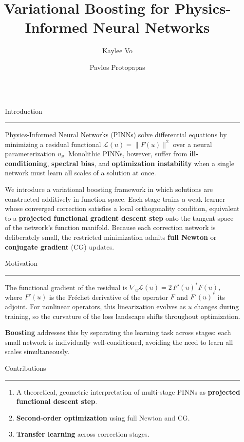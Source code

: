 \documentclass[final]{beamer}
\title{Variational Boosting for Physics-Informed Neural
Networks}
\author{Kaylee Vo \and Pavlos Protopapas}
\institute[shortinst]{Harvard John A. Paulson School of Engineering and Applied Sciences}
\newlength{\sepwidth}
\newlength{\colwidth}
\newcommand{\separatorcolumn}{\begin{column}{\sepwidth}\end{column}}
\newcommand{\blockrule}{\vspace{-1.5em}\textcolor{harvardcrimson}{\rule{\linewidth}{1.2pt}}\vspace{-0.2em}}
\begin{document}
\begin{frame}[t]
\begin{columns}[t]
\separatorcolumn

\begin{column}{\colwidth}

  \begin{block}{Introduction}
    \blockrule
    
    Physics-Informed Neural Networks (PINNs) solve differential equations by minimizing a residual functional $\mathcal{L}(u) = \|F(u)\|^2$ over a neural parameterization $u_\theta$. Monolithic PINNs, however, suffer from \textbf{ill-conditioning}, \textbf{spectral bias}, and \textbf{optimization instability} when a single network must learn all scales of a solution at once.

    We introduce a variational boosting framework \cite{fang-2023} in which solutions are constructed additively in function space. Each stage trains a weak learner whose converged correction satisfies a local orthogonality condition, equivalent to a \textbf{projected functional gradient descent step} onto the tangent space of the network's function manifold. Because each correction network is deliberately small, the restricted minimization admits  \textbf{full Newton} or \textbf{conjugate gradient} (CG) updates. 

  \end{block}
    \vspace{-0.5em}
  \begin{block}{Motivation}
    \blockrule
    
    The functional gradient of the residual is
    $
      \nabla_u \mathcal{L}(u) = 2\,F'(u)^{*}F(u),
    $
    where $F'(u)$ is the Fr\'echet derivative of the operator $F$ and $F'(u)^*$ its adjoint. For nonlinear operators, this linearization evolves as $u$ changes during training, so the curvature of the loss landscape shifts throughout optimization.

    \textbf{Boosting} addresses this by separating the learning task across stages: each small network is individually well-conditioned, avoiding the need to learn all scales simultaneously.

  \end{block}
    \vspace{-1em}
  \begin{alertblock}{Contributions}
    \blockrule
    
    \begin{enumerate}
      \item A theoretical, geometric interpretation of multi-stage PINNs as
        \textbf{projected functional descent step}.
      \item \textbf{Second-order optimization} using full Newton and CG.
      \item \textbf{Transfer learning} across correction stages.
    \end{enumerate}


\end{alertblock}
\end{column}
\end{columns}
\end{frame}
\end{document}
